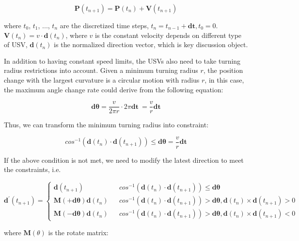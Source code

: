 \documentclass{mcmthesis}
\begin{document}
\begin{equation}
\mathbf{P}(t_{n+1})=\mathbf{P}(t_{n})+\mathbf{V}(t_{n+1})
\end{equation}

where $t_0$, $t_1$, ..., $t_n$ are the discretized time steps, $t_n = t_{n-1} + \mathbf{dt}, t_{0}=0$. $\mathbf{V}(t_{n})=v \cdot \mathbf{d}(t_{n})$, where $v$ is the constant velocity depends on different type of USV, $\mathbf{d}(t_{n})$ is the normalized direction vector, which is key discussion object. \par

In addition to having constant speed limits, the USVs also need to take turning radius restrictions into account. Given a minimum turning radius $r$, the position change with the largest curvature is a circular motion with radius $r$, in this case, the maximum angle change rate could derive from the following equation:

\begin{equation}
\mathbf{d \theta} = \frac{v}{2 \pi r} \cdot 2 \pi \mathbf{dt} \
= \frac{v}{r} \mathbf{dt}
\end{equation}

Thus, we can transform the minimum turning radius into constraint:

\begin{equation}
cos^{-1}(\mathbf{d}(t_{n}) \cdot \mathbf{d}(t_{n+1})) \le \mathbf{d \theta} = \frac{v}{r} \mathbf{dt}
\end{equation}

If the above condition is not met, we need to modify the latest direction to meet the constraints, i.e.

\begin{equation}
\mathbf{d}^{'}(t_{n+1}) =\left\{
\begin{array}{rcl}
\mathbf{d}(t_{n+1}) & & {cos^{-1}(\mathbf{d}(t_{n}) \cdot \mathbf{d}(t_{n+1})) \le \mathbf{d \theta}} \\
\mathbf{M}(+\mathbf{d \theta}) \mathbf{d}(t_{n}) & & {cos^{-1}(\mathbf{d}(t_{n}) \cdot \mathbf{d}(t_{n+1})) > \mathbf{d \theta}, \mathbf{d}(t_{n}) \times \mathbf{d}(t_{n+1})}>0 \\
\mathbf{M}(-\mathbf{d \theta}) \mathbf{d}(t_{n}) & & {cos^{-1}(\mathbf{d}(t_{n}) \cdot \mathbf{d}(t_{n+1})) > \mathbf{d \theta}, \mathbf{d}(t_{n}) \times \mathbf{d}(t_{n+1})}<0
\end{array} \right.
\end{equation}

where $\mathbf{M}(\theta)$ is the rotate matrix:
\end{document}
